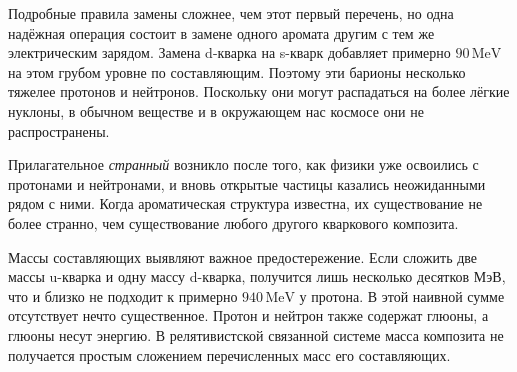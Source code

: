 \begin{classroomqa}
\end{classroomqa}

Подробные правила замены сложнее, чем этот первый перечень, но одна надёжная операция состоит в замене одного аромата другим с тем же электрическим зарядом. Замена d-кварка на s-кварк добавляет примерно \(90\,\mathrm{MeV}\) на этом грубом уровне по составляющим. Поэтому эти барионы несколько тяжелее протонов и нейтронов. Поскольку они могут распадаться на более лёгкие нуклоны, в обычном веществе и в окружающем нас космосе они не распространены.

\begin{classroomqa}
\end{classroomqa}

\begin{classroomqa}
\end{classroomqa}

Прилагательное \emph{странный} возникло после того, как физики уже освоились с протонами и нейтронами, и вновь открытые частицы казались неожиданными рядом с ними. Когда ароматическая структура известна, их существование не более странно, чем существование любого другого кваркового композита.

Массы составляющих выявляют важное предостережение. Если сложить две массы u-кварка и одну массу d-кварка, получится лишь несколько десятков МэВ, что и близко не подходит к примерно \(940\,\mathrm{MeV}\) у протона. В этой наивной сумме отсутствует нечто существенное. Протон и нейтрон также содержат глюоны, а глюоны несут энергию. В релятивистской связанной системе масса композита не получается простым сложением перечисленных масс его составляющих.


